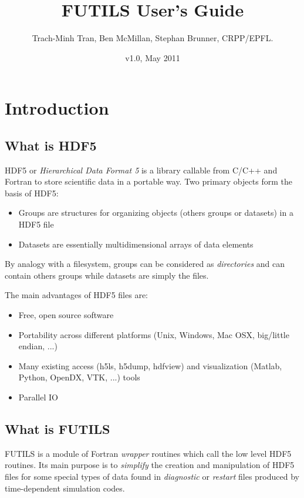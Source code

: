 \documentclass[a4paper]{article}
\title{FUTILS User's Guide}
\author{Trach-Minh Tran, Ben McMillan, Stephan Brunner, CRPP/EPFL.}
\date{v1.0, May 2011}
\begin{document}
\maketitle
\tableofcontents

\section{Introduction}


\subsection{What is HDF5}

HDF5 or {\itshape Hierarchical Data Format 5\/} is a library callable from
C/C++ and Fortran to store scientific data in a portable
way. Two primary objects form the basis of HDF5:
\begin{itemize}
\item  Groups are structures for organizing objects (others groups or
datasets) in a HDF5 file
\item  Datasets are essentially multidimensional arrays of data elements
\end{itemize}

By analogy with a filesystem, groups can be considered as
{\itshape directories\/} and can contain others groups while datasets are simply
the files.

The main advantages of HDF5 files are:
\begin{itemize}
\item  Free, open source software
\item  Portability across different platforms (Unix, Windows, Mac OSX,
big/little endian, ...)
\item  Many existing access (h5ls, h5dump, hdfview) and visualization (Matlab,
Python, OpenDX, VTK, ...) tools
\item  Parallel IO
\end{itemize}





\subsection{What is FUTILS}

FUTILS is a module of Fortran {\itshape wrapper\/} routines which call the low
level HDF5 routines. Its main purpose is to {\itshape simplify\/} the creation and
manipulation of HDF5 files for some special types of data found in
{\itshape diagnostic\/} or {\itshape restart\/} files produced by time-dependent
simulation codes.
\end{document}
